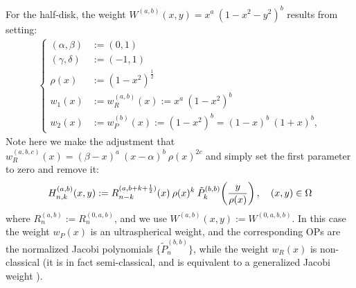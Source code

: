 \documentclass[11pt, oneside]{article}   	%
\newcommand{\half}{\frac{1}{2}}
\newcommand{\hdop}{H}
\newcommand{\hdopnk}{\hdop_{n,k}}
\newcommand{\hdopnkab}{\hdop_{n,k}^{(a,b)}}
\newcommand{\jac}{{\tilde P}}
\newcommand{\genjac}{R}
\newcommand{\genjacnmk}{\genjac_{n-k}}
\newcommand{\genjacw}{w_\genjac}
\newcommand{\jacw}{w_P}
\newcommand{\normgenjac}{\omega_\genjac}
\newcommand{\normjac}{\omega_P}
\begin{document}
For the half-disk, the weight $W^{(a,b)}(x,y) = x^a \: (1-x^2-y^2)^b$ results from setting:
\begin{align*}
\begin{cases}
(\alpha,\beta) &:= (0,1) \\
(\gamma,\delta) &:= (-1,1) \\
\rho(x) &:= (1-x^2)^{\half} \\
w_1(x) &:= \genjacw^{(a,b)}(x) := x^a \: (1-x^2)^b \\
w_2(x) &:= \jacw^{(b)}(x) := (1-x^2)^b = (1-x)^b \: (1+x)^b,
\end{cases}
\end{align*}
Note here we make the adjustment that $\genjacw^{(a,b,c)}(x) = (\beta - x)^a \: (x - \alpha)^{b} \: \rho(x)^{2c}$ and simply set the first parameter to zero and remove it:
\begin{align}\label{eq:diskpolys}
	\hdopnk^{(a,b)}(x,y) := \genjacnmk^{(a, b+k+\half)}(x) \: \rho(x)^k \: \jac_k^{(b,b)}\fpr(\frac{y}{\rho(x)}), \quad (x,y) \in \Omega
\end{align}
where $\genjac_n^{(a, b)}  := \genjac_n^{(0,a, b)}$, and we use $W^{(a,b)}(x,y) := W^{(0,a,b,b)}$. In this case the weight $\jacw(x)$ is an ultraspherical weight, and the corresponding OPs are the normalized Jacobi polynomials $\{\jac_n^{(b, b)}\}$, while the weight $w_R(x)$ is non-classical (it is in fact semi-classical, and is equivalent to a generalized Jacobi weight \cite[\S5]{magnus1995painleve}).
%
%
\end{document}
